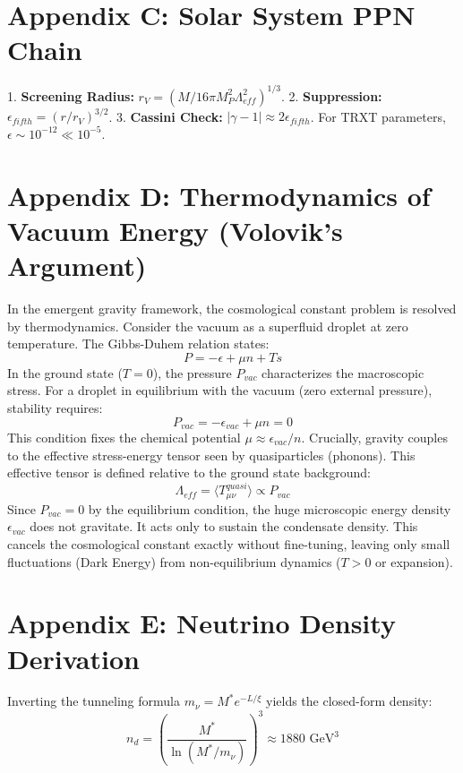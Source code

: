 \documentclass[a4paper,12pt]{article}
\begin{document}
\section{Appendix C: Solar System PPN Chain}
1. \textbf{Screening Radius:} $r_V = (M / 16\pi M_P^2 \Lambda_{eff}^2)^{1/3}$.
2. \textbf{Suppression:} $\epsilon_{fifth} = (r/r_V)^{3/2}$.
3. \textbf{Cassini Check:} $|\gamma-1| \approx 2\epsilon_{fifth}$. For TRXT parameters, $\epsilon \sim 10^{-12} \ll 10^{-5}$.

\section{Appendix D: Thermodynamics of Vacuum Energy (Volovik's Argument)}
In the emergent gravity framework, the cosmological constant problem is resolved by thermodynamics.
Consider the vacuum as a superfluid droplet at zero temperature. The Gibbs-Duhem relation states:
\begin{equation}
    P = -\epsilon + \mu n + Ts
\end{equation}
In the ground state ($T=0$), the pressure $P_{vac}$ characterizes the macroscopic stress.
For a droplet in equilibrium with the vacuum (zero external pressure), stability requires:
\begin{equation}
    P_{vac} = -\epsilon_{vac} + \mu n = 0
\end{equation}
This condition fixes the chemical potential $\mu \approx \epsilon_{vac}/n$.
Crucially, gravity couples to the effective stress-energy tensor seen by quasiparticles (phonons). This effective tensor is defined relative to the ground state background:
\begin{equation}
    \Lambda_{eff} = \langle T_{\mu\nu}^{quasi} \rangle \propto P_{vac}
\end{equation}
Since $P_{vac} = 0$ by the equilibrium condition, the huge microscopic energy density $\epsilon_{vac}$ does not gravitate. It acts only to sustain the condensate density. This cancels the cosmological constant exactly without fine-tuning, leaving only small fluctuations (Dark Energy) from non-equilibrium dynamics ($T > 0$ or expansion).

\section{Appendix E: Neutrino Density Derivation}
Inverting the tunneling formula $m_\nu = M^* e^{-L/\xi}$ yields the closed-form density:
\begin{equation}
    n_d = \left( \frac{M^*}{\ln(M^*/m_\nu)} \right)^3 \approx 1880 \text{ GeV}^3
\end{equation}
\end{document}
